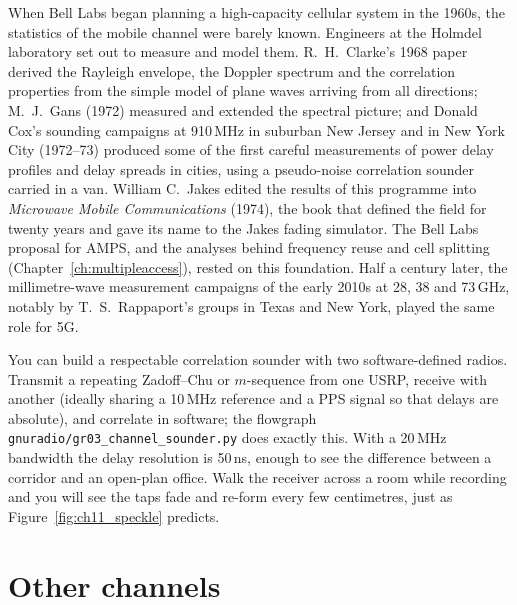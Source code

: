 \begin{history}
When Bell Labs began planning a high-capacity cellular system in the 1960s, the statistics of the
mobile channel were barely known. Engineers at the Holmdel laboratory set out to measure and model
them. R.~H.~Clarke's 1968 paper derived the Rayleigh envelope, the Doppler spectrum and the
correlation properties from the simple model of plane waves arriving from all directions; M.~J.~Gans
(1972) measured and extended the spectral picture; and Donald Cox's sounding campaigns at 910\,MHz in
suburban New Jersey and in New York City (1972--73) produced some of the first careful measurements of
power delay profiles and delay spreads in cities, using a pseudo-noise correlation sounder carried
in a van. William C.~Jakes edited the results of this programme into \emph{Microwave Mobile
Communications} (1974), the book that defined the field for twenty years and gave its name to the
Jakes fading simulator. The Bell Labs proposal for AMPS, and the analyses behind frequency reuse and
cell splitting (Chapter~\ref{ch:multipleaccess}), rested on this foundation. Half a century later,
the millimetre-wave measurement campaigns of the early 2010s at 28, 38 and 73\,GHz, notably by
T.~S.~Rappaport's groups in Texas and New York, played the same role for 5G.
\end{history}

\begin{inpractice}
You can build a respectable correlation sounder with two software-defined radios. Transmit a
repeating Zadoff--Chu or $m$-sequence from one USRP, receive with another (ideally sharing a
10\,MHz reference and a PPS signal so that delays are absolute), and correlate in software; the
flowgraph \texttt{gnuradio/gr03\_channel\_sounder.py} does exactly this. With a 20\,MHz bandwidth the
delay resolution is 50\,ns, enough to see the difference between a corridor and an open-plan
office. Walk the receiver across a room while recording and you will see the taps fade and
re-form every few centimetres, just as Figure~\ref{fig:ch11_speckle} predicts.
\end{inpractice}

\section{Other channels}
\label{sec:ch11:other}

